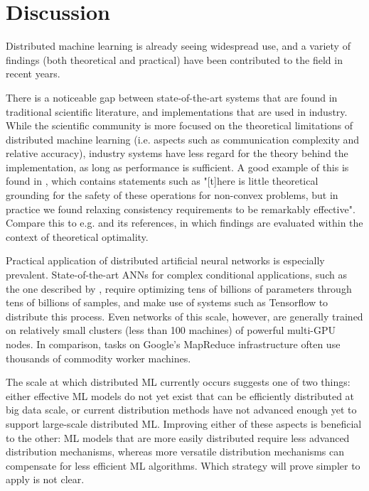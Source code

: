 \section{Discussion}
Distributed machine learning is already seeing widespread use, and a variety of findings (both theoretical and practical) have been contributed to the field in recent years.

There is a noticeable gap between state-of-the-art systems that are found in traditional scientific literature, and implementations that are used in industry. While the scientific community is more focused on the theoretical limitations of distributed machine learning (i.e. aspects such as communication complexity and relative accuracy), industry systems have less regard for the theory behind the implementation, as long as performance is sufficient. A good example of this is found in \citep{DistBelief2012}, which contains statements such as "[t]here is little theoretical grounding for the safety of these operations for non-convex problems, but in practice we found relaxing consistency requirements to be remarkably effective". Compare this to e.g. \citep{Xing16} and its references, in which findings are evaluated within the context of theoretical optimality.

Practical application of distributed artificial neural networks is especially prevalent. State-of-the-art ANNs for complex conditional applications, such as the one described by \citet{Shazeer2017}, require optimizing tens of billions of parameters through tens of billions of samples, and make use of systems such as Tensorflow\citep{Tensorflow2015}\citep{Tensorflow2016} to distribute this process. Even networks of this scale, however, are generally trained on relatively small clusters (less than 100 machines) of powerful multi-GPU nodes. In comparison, tasks on Google's MapReduce infrastructure often use thousands of commodity worker machines\citep{MapReduce}.

The scale at which distributed ML currently occurs suggests one of two things: either effective ML models do not yet exist that can be efficiently distributed at big data scale, or current distribution methods have not advanced enough yet to support large-scale distributed ML. Improving either of these aspects is beneficial to the other: ML models that are more easily distributed require less advanced distribution mechanisms, whereas more versatile distribution mechanisms can compensate for less efficient ML algorithms. Which strategy will prove simpler to apply is not clear.
